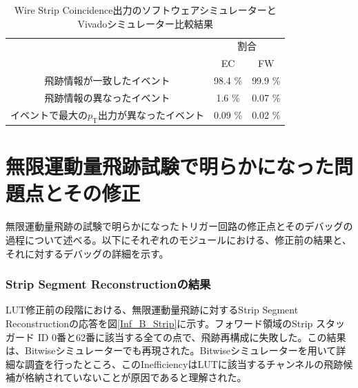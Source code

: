 \begin{table}[]
    \centering
    \caption{Wire Strip Coincidence出力のソフトウェアシミュレーターとVivadoシミュレーター比較結果}
    \label{tab:Vivado_WS}
    \begin{tabular}{|c|cc|}
    \hline
    \multirow{2}{*}{}                      & \multicolumn{2}{c|}{割合}                \\ \cline{2-3} 
                                           & \multicolumn{1}{c|}{EC}      & FW      \\ \hline\hline
    飛跡情報が一致したイベント                          & \multicolumn{1}{c|}{98.4 \%} & 99.9 \% \\ \hline
    飛跡情報の異なったイベント                          & \multicolumn{1}{c|}{1.6 \%}  & 0.07 \% \\ \hline
    イベントで最大の$p_\mathrm{T}$出力が異なったイベント & \multicolumn{1}{c|}{0.09 \%} & 0.02 \% \\ \hline
    \end{tabular}
\end{table}



\clearpage


\section{無限運動量飛跡試験で明らかになった問題点とその修正}
\label{sec:appendix:infinite-momentum-tracks}
無限運動量飛跡の試験で明らかになったトリガー回路の修正点とそのデバッグの過程について述べる。以下にそれぞれのモジュールにおける、修正前の結果と、それに対するデバッグの詳細を示す。


\subsubsection{Strip Segment Reconstructionの結果}
LUT修正前の段階における、無限運動量飛跡に対するStrip Segment Reconstructionの応答を図\ref{Inf_B_Strip}に示す。フォワード領域のStrip スタッガード ID 0番と62番に該当する全ての点で、飛跡再構成に失敗した。この結果は、Bitwiseシミュレーターでも再現された。Bitwiseシミュレーターを用いて詳細な調査を行ったところ、このInefficiencyはLUTに該当するチャンネルの飛跡候補が格納されていないことが原因であると理解された。

